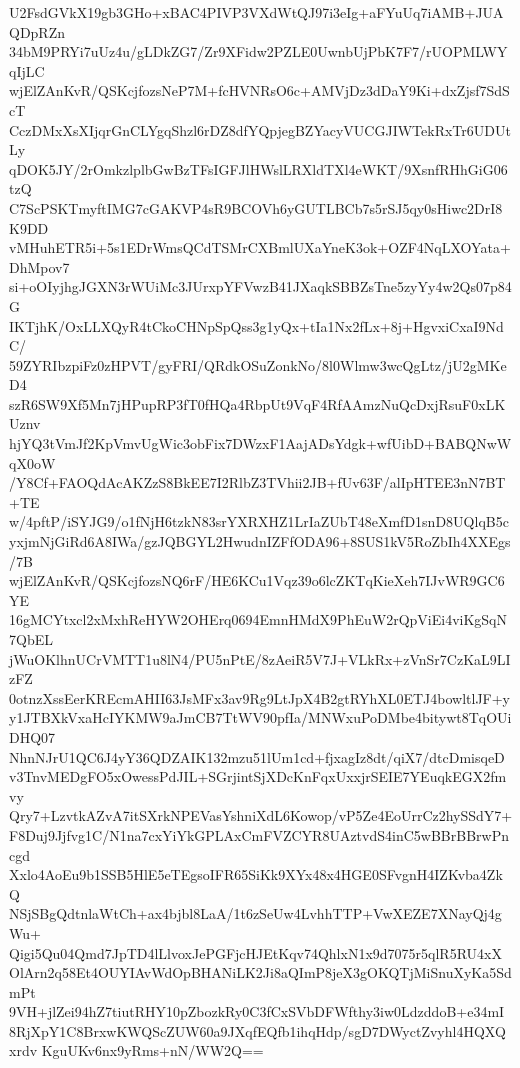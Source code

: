 U2FsdGVkX19gb3GHo+xBAC4PIVP3VXdWtQJ97i3eIg+aFYuUq7iAMB+JUAQDpRZn
34bM9PRYi7uUz4u/gLDkZG7/Zr9XFidw2PZLE0UwnbUjPbK7F7/rUOPMLWYqIjLC
wjElZAnKvR/QSKcjfozsNeP7M+fcHVNRsO6c+AMVjDz3dDaY9Ki+dxZjsf7SdScT
CczDMxXsXIjqrGnCLYgqShzl6rDZ8dfYQpjegBZYacyVUCGJIWTekRxTr6UDUtLy
qDOK5JY/2rOmkzlplbGwBzTFsIGFJlHWslLRXldTXl4eWKT/9XsnfRHhGiG06tzQ
C7ScPSKTmyftIMG7cGAKVP4sR9BCOVh6yGUTLBCb7s5rSJ5qy0sHiwc2DrI8K9DD
vMHuhETR5i+5s1EDrWmsQCdTSMrCXBmlUXaYneK3ok+OZF4NqLXOYata+DhMpov7
si+oOIyjhgJGXN3rWUiMc3JUrxpYFVwzB41JXaqkSBBZsTne5zyYy4w2Qs07p84G
IKTjhK/OxLLXQyR4tCkoCHNpSpQss3g1yQx+tIa1Nx2fLx+8j+HgvxiCxaI9NdC/
59ZYRIbzpiFz0zHPVT/gyFRI/QRdkOSuZonkNo/8l0Wlmw3wcQgLtz/jU2gMKeD4
szR6SW9Xf5Mn7jHPupRP3fT0fHQa4RbpUt9VqF4RfAAmzNuQcDxjRsuF0xLKUznv
hjYQ3tVmJf2KpVmvUgWic3obFix7DWzxF1AajADsYdgk+wfUibD+BABQNwWqX0oW
/Y8Cf+FAOQdAcAKZzS8BkEE7I2RlbZ3TVhii2JB+fUv63F/alIpHTEE3nN7BT+TE
w/4pftP/iSYJG9/o1fNjH6tzkN83srYXRXHZ1LrIaZUbT48eXmfD1snD8UQlqB5c
yxjmNjGiRd6A8IWa/gzJQBGYL2HwudnIZFfODA96+8SUS1kV5RoZbIh4XXEgs/7B
wjElZAnKvR/QSKcjfozsNQ6rF/HE6KCu1Vqz39o6lcZKTqKieXeh7IJvWR9GC6YE
16gMCYtxcl2xMxhReHYW2OHErq0694EmnHMdX9PhEuW2rQpViEi4viKgSqN7QbEL
jWuOKlhnUCrVMTT1u8lN4/PU5nPtE/8zAeiR5V7J+VLkRx+zVnSr7CzKaL9LIzFZ
0otnzXssEerKREcmAHII63JsMFx3av9Rg9LtJpX4B2gtRYhXL0ETJ4bowltlJF+y
y1JTBXkVxaHcIYKMW9aJmCB7TtWV90pfIa/MNWxuPoDMbe4bitywt8TqOUiDHQ07
NhnNJrU1QC6J4yY36QDZAIK132mzu51lUm1cd+fjxagIz8dt/qiX7/dtcDmisqeD
v3TnvMEDgFO5xOwessPdJIL+SGrjintSjXDcKnFqxUxxjrSEIE7YEuqkEGX2fmvy
Qry7+LzvtkAZvA7itSXrkNPEVasYshniXdL6Kowop/vP5Ze4EoUrrCz2hySSdY7+
F8Duj9Jjfvg1C/N1na7cxYiYkGPLAxCmFVZCYR8UAztvdS4inC5wBBrBBrwPncgd
Xxlo4AoEu9b1SSB5HlE5eTEgsoIFR65SiKk9XYx48x4HGE0SFvgnH4IZKvba4ZkQ
NSjSBgQdtnlaWtCh+ax4bjbl8LaA/1t6zSeUw4LvhhTTP+VwXEZE7XNayQj4gWu+
Qigi5Qu04Qmd7JpTD4lLlvoxJePGFjcHJEtKqv74QhlxN1x9d7075r5qlR5RU4xX
OlArn2q58Et4OUYIAvWdOpBHANiLK2Ji8aQImP8jeX3gOKQTjMiSnuXyKa5SdmPt
9VH+jlZei94hZ7tiutRHY10pZbozkRy0C3fCxSVbDFWfthy3iw0LdzddoB+e34mI
8RjXpY1C8BrxwKWQScZUW60a9JXqfEQfb1ihqHdp/sgD7DWyctZvyhl4HQXQxrdv
KguUKv6nx9yRms+nN/WW2Q==
